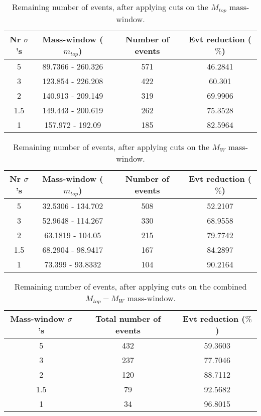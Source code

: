 \documentclass{article}
\begin{document}
 \begin{table}[h!t] 
  \caption{Remaining number of events, after applying cuts on the $M_{top}$ mass-window.} 
  \centering 
   \begin{tabular}{c|c|c|c|}
     Nr $\sigma$'s & Mass-window ($m_{top}$)   & Number of events   & Evt reduction ($\%$)     \\
     \hline
     5 & 89.7366 - 260.326  &   571 &  46.2841 \\ 
     3 & 123.854 - 226.208  &   422 &  60.301 \\ 
     2 & 140.913 - 209.149  &   319 &  69.9906 \\ 
     1.5 & 149.443 - 200.619  &   262 &  75.3528 \\ 
     1 & 157.972 - 192.09  &   185 &  82.5964 \\ 
   \end{tabular} 
 \end{table} 
 
 \begin{table}[h!t] 
  \caption{Remaining number of events, after applying cuts on the $M_{W}$ mass-window.} 
  \centering 
   \begin{tabular}{c|c|c|c|}
     Nr $\sigma$'s & Mass-window ($m_{top}$)    & Number of events   & Evt reduction ($\%$)    \\
     \hline
     5 & 32.5306 - 134.702  &   508 & 52.2107 \\ 
     3 & 52.9648 - 114.267  &   330 & 68.9558 \\ 
     2 & 63.1819 - 104.05  &   215 & 79.7742 \\ 
     1.5 & 68.2904 - 98.9417  &   167 & 84.2897 \\ 
     1 & 73.399 - 93.8332  &   104 & 90.2164 \\ 
   \end{tabular} 
 \end{table} 
 
 \begin{table}[h!t] 
  \caption{Remaining number of events, after applying cuts on the combined $M_{top}-M_{W}$ mass-window.} 
  \centering 
   \begin{tabular}{c|c|c|} 
     Mass-window $\sigma$'s & Total number of events    & Evt reduction ($\%$)     \\ 
     \hline
     5 & 432 & 59.3603 \\ 
     3 & 237 & 77.7046 \\ 
     2 & 120 & 88.7112 \\ 
     1.5 & 79 & 92.5682 \\ 
     1 & 34 & 96.8015 \\ 
   \end{tabular} 
 \end{table} 
 
\end{document}
